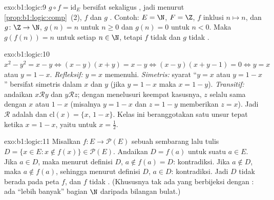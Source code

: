 \begin{solution}{exo:b1:logic:9}
$g \circ f = \mathrm{id}_E$ bersifat  sekaligus , jadi menurut
\cref{prop:b1:logic:comp}~(2), $f$  dan $g$ .
Contoh: $E = \N$, $F = \Z$, $f$  inklusi $n \mapsto n$, dan
$g \colon \Z \to \N$, $g(n) = n$ untuk $n \geq 0$ dan $g(n) = 0$ untuk
$n < 0$. Maka $g(f(n)) = n$ untuk setiap $n \in \N$, tetapi $f$ tidak
 dan $g$ tidak .
\end{solution}

\begin{solution}{exo:b1:logic:10}
$x^2 - y^2 = x - y \iff (x - y)(x + y) = x - y \iff (x - y)(x + y - 1)
= 0 \iff y = x$ atau $y = 1 - x$. \emph{Refleksif:} $y = x$ memenuhi.
\emph{Simetris:} syarat ``$y = x$ atau $y = 1 - x$'' bersifat
simetris dalam $x$ dan $y$ (jika $y = 1 - x$ maka $x = 1 - y$).
\emph{Transitif:} andaikan $x \mathbin{\mathcal{R}} y$ dan $y
\mathbin{\mathcal{R}} z$; dengan menelusuri keempat kasusnya, $z$ selalu sama dengan $x$
atau $1 - x$ (misalnya $y = 1 - x$ dan $z = 1 - y$ memberikan $z = x$).
Jadi $\mathcal{R}$ adalah  dan $\mathrm{cl}(x) =
\{x,\, 1 - x\}$. Kelas ini beranggotakan satu unsur tepat ketika $x = 1 - x$,
yaitu untuk $x = \frac12$.
\end{solution}

\begin{solution}{exo:b1:logic:11}
Misalkan $f \colon E \to \mathcal{P}(E)$ sebuah  sembarang lalu tulis
$D = \{x \in E : x \notin f(x)\} \in \mathcal{P}(E)$. Andaikan $D =
f(a)$ untuk suatu $a \in E$. Jika $a \in D$, maka menurut definisi $D$,
$a \notin f(a) = D$: kontradiksi. Jika $a \notin D$, maka $a \notin
f(a)$, sehingga menurut definisi $D$, $a \in D$: kontradiksi. Jadi $D$
tidak berada pada peta $f$, dan $f$ tidak . (Khususnya tak ada
 yang berbijeksi dengan : ada ``lebih banyak''
 bagian $\N$ daripada bilangan bulat.)
\end{solution}

